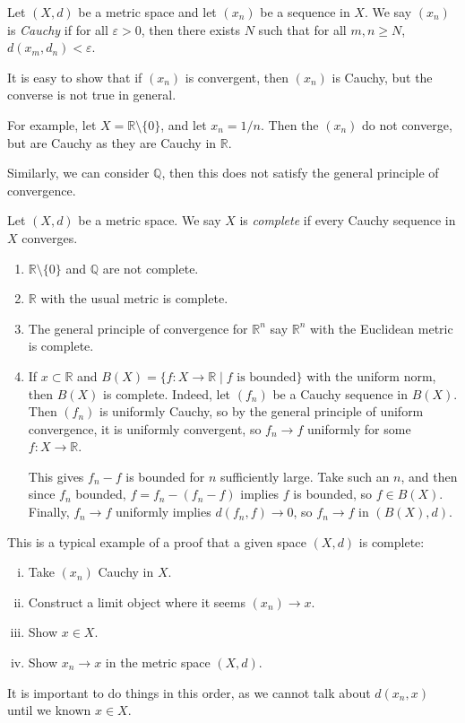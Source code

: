 \documentclass[12pt]{article}
\begin{document}
\begin{definition}
	Let $(X, d)$ be a metric space and let $(x_n)$ be a sequence in $X$. We say $(x_n)$ is \textit{Cauchy} if for all $\varepsilon > 0$, then there exists $N$ such that for all $m, n \geq N$, $d(x_m, d_n) < \varepsilon$.
\end{definition}

It is easy to show that if $(x_n)$ is convergent, then $(x_n)$ is Cauchy, but the converse is not true in general.

For example, let $X = \mathbb{R} \setminus \{0\}$, and let $x_n = 1/n$. Then the $(x_n)$ do not converge, but are Cauchy as they are Cauchy in $\mathbb{R}$.

Similarly, we can consider $\mathbb{Q}$, then this does not satisfy the general principle of convergence.

\begin{definition}
	Let $(X, d)$ be a metric space. We say $X$ is \textit{complete} if every Cauchy sequence in $X$ converges.
\end{definition}

\begin{exbox}
	\begin{enumerate}[1.]
		\item $\mathbb{R} \setminus \{0\}$ and $\mathbb{Q}$ are not complete.
		\item $\mathbb{R}$ with the usual metric is complete.
		\item The general principle of convergence for $\mathbb{R}^{n}$ say $\mathbb{R}^{n}$ with the Euclidean metric is complete.
		\item If $x \subset \mathbb{R}$ and $B(X) = \{f : X \to \mathbb{R} \mid f \text{ is bounded}\}$ with the uniform norm, then $B(X)$ is complete. Indeed, let $(f_n)$ be a Cauchy sequence in $B(X)$. Then $(f_n)$ is uniformly Cauchy, so by the general principle of uniform convergence, it is uniformly convergent, so $f_n \to f$ uniformly for some $f : X \to \mathbb{R}$.

			This gives $f_n - f$ is bounded for $n$ sufficiently large. Take such an $n$, and then since $f_n$ bounded, $f = f_n - (f_n - f)$ implies $f$ is bounded, so $f \in B(X)$. Finally, $f_n \to f$ uniformly implies $d(f_n, f) \to 0$, so $f_n \to f$ in $(B(X), d)$.
	\end{enumerate}
\end{exbox}

\begin{remark}
	This is a typical example of a proof that a given space $(X, d)$ is complete:
	\begin{enumerate}[(i)]
		\item Take $(x_n)$ Cauchy in $X$.
		\item Construct a limit object where it seems $(x_n) \to x$.
		\item Show $x \in X$.
		\item Show $x_n \to x$ in the metric space $(X, d)$.
	\end{enumerate}
	It is important to do things in this order, as we cannot talk about $d(x_n, x)$ until we known $x \in X$.
\end{remark}
\end{document}

